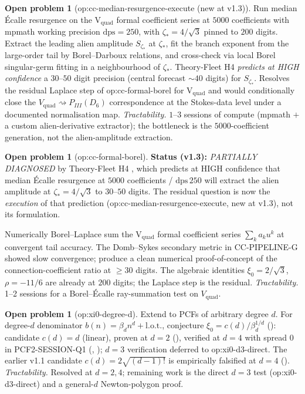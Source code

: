 \documentclass[11pt,reqno]{amsart}
\theoremstyle{plain}
\theoremstyle{definition}
\newtheorem{problem}[theorem]{Open problem}
\theoremstyle{remark}
\newcommand{\Vquad}{V_{\mathrm{quad}}}
\begin{document}
\begin{problem}[\textsf{op:cc-median-resurgence-execute} (new at v1.3)]
Run median \'Ecalle resurgence on the V$_{\mathrm{quad}}$
formal coefficient series at $5000$ coefficients with
mpmath working precision $\mathrm{dps} = 250$, with
$\zeta_* = 4/\sqrt 3$ pinned to $200$ digits. Extract the
leading alien amplitude $S_{\zeta_*}$ at $\zeta_*$, fit the
branch exponent from the large-order tail by Borel--Darboux
relations, and cross-check via local Borel singular-germ
fitting in a neighbourhood of $\zeta_*$. Theory-Fleet H4
\cite{siarc_theory_fleet_h4} \emph{predicts at HIGH
confidence} a $30$--$50$ digit precision (central forecast
${\sim}40$ digits) for $S_{\zeta_*}$. Resolves the
residual Laplace step of \textsf{op:cc-formal-borel} for
V$_{\mathrm{quad}}$ and would conditionally close the
$\Vquad \rightsquigarrow P_{III}(D_6)$ correspondence at
the Stokes-data level under a documented normalisation map.
\emph{Tractability.} $1$--$3$ sessions of compute (mpmath
$+$ a custom alien-derivative extractor); the bottleneck is
the $5000$-coefficient generation, not the alien-amplitude
extraction.
\end{problem}

\begin{problem}[\textsf{op:cc-formal-borel}]
\textbf{Status (v1.3):} \emph{PARTIALLY DIAGNOSED} by
Theory-Fleet H4 \cite{siarc_theory_fleet_h4}, which
predicts at HIGH confidence that median \'Ecalle
resurgence at $5000$ coefficients / $\mathrm{dps}\,250$
will extract the alien amplitude at $\zeta_* = 4/\sqrt 3$
to $30$--$50$ digits. The residual question is now the
\emph{execution} of that prediction
(\textsf{op:cc-median-resurgence-execute}, new at v1.3),
not its formulation.

Numerically Borel--Laplace sum the V$_\mathrm{quad}$
formal coefficient series $\sum_k a_k u^k$ at convergent
tail accuracy. The Domb--Sykes secondary metric in
CC-PIPELINE-G \cite{siarc_cc_pipeline_g} showed slow
convergence; produce a clean numerical proof-of-concept of
the connection-coefficient ratio at $\ge 30$ digits. The
algebraic identities $\xi_0 = 2/\sqrt 3$, $\rho = -11/6$
are already at $200$ digits; the Laplace step is the residual.
\emph{Tractability.} 1--2 sessions for a Borel--\'Ecalle
ray-summation test on $\Vquad$.
\end{problem}

\begin{problem}[\textsf{op:xi0-degree-d}]
Extend  to PCFs of arbitrary degree $d$. For
degree-$d$ denominator $b(n) = \beta_d n^d +
\mathrm{l.o.t.}$, conjecture $\xi_0 = c(d) / \beta_d^{1/d}$
(): candidate $c(d) = d$ (linear),
proven at $d=2$ (), verified at $d=4$
with spread $0$ in PCF2-SESSION-Q1
(, \cite{siarc_pcf2_session_q1});
$d=3$ verification deferred to \textsf{op:xi0-d3-direct}.
The earlier v1.1 candidate $c(d) = 2\sqrt{(d-1)!}$ is
empirically falsified at $d=4$
().
\emph{Tractability.} Resolved at $d=2,4$; remaining work is
the direct $d=3$ test (\textsf{op:xi0-d3-direct}) and a
general-$d$ Newton-polygon proof.
\end{problem}
\end{document}
